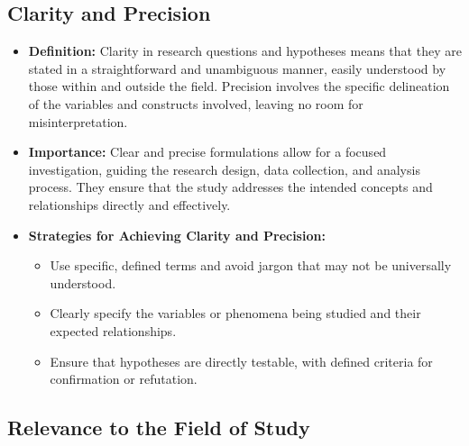 \documentclass[
]{book}
\providecommand{\tightlist}{%
  \setlength{\itemsep}{0pt}\setlength{\parskip}{0pt}}
\begin{document}
\hypertarget{clarity-and-precision}{%
\subsection*{Clarity and Precision}\label{clarity-and-precision}}

\begin{itemize}
\item
  \textbf{Definition:} Clarity in research questions and hypotheses means that they are stated in a straightforward and unambiguous manner, easily understood by those within and outside the field. Precision involves the specific delineation of the variables and constructs involved, leaving no room for misinterpretation.
\item
  \textbf{Importance:} Clear and precise formulations allow for a focused investigation, guiding the research design, data collection, and analysis process. They ensure that the study addresses the intended concepts and relationships directly and effectively.
\item
  \textbf{Strategies for Achieving Clarity and Precision:}

  \begin{itemize}
  \tightlist
  \item
    Use specific, defined terms and avoid jargon that may not be universally understood.
  \item
    Clearly specify the variables or phenomena being studied and their expected relationships.
  \item
    Ensure that hypotheses are directly testable, with defined criteria for confirmation or refutation.
  \end{itemize}
\end{itemize}

\hypertarget{relevance-to-the-field-of-study}{%
\subsection*{Relevance to the Field of Study}\label{relevance-to-the-field-of-study}}
\end{document}
